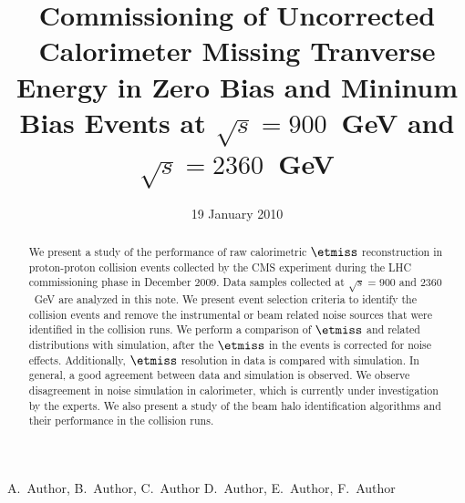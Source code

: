 
\begin{titlepage}


   \date{19 January 2010}

  \title{Commissioning of Uncorrected Calorimeter Missing Tranverse Energy in Zero Bias and Mininum Bias Events at $\sqrt{s}=900$~GeV and $\sqrt{s}=2360$~GeV}

  \begin{Authlist}
    A.~Author, B.~Author, C.~Author
    D.~Author, E.~Author, F.~Author
  \end{Authlist}



  \begin{abstract}
    
    We present a study of the performance of raw calorimetric $\etmiss$ reconstruction in
    proton-proton collision events collected by the CMS experiment during the LHC
    commissioning phase in December 2009. Data samples collected at
    $\sqrt{s}=900$ and $2360$~GeV are analyzed in this note. We present
     event selection criteria to identify the collision events and remove the instrumental or beam
    related noise sources that were identified in the collision
    runs. We perform a comparison of $\etmiss$ and related distributions with
    simulation, after the $\etmiss$ in the events is corrected for noise
    effects. Additionally, $\etmiss$ resolution in data is
    compared with simulation. In general, a good agreement between data and simulation is
    observed. We observe disagreement in noise simulation in
    calorimeter, which is currently under investigation by the
    experts. We also present a study of the beam halo identification
    algorithms and their performance in the collision runs.

  \end{abstract} 

  
\end{titlepage}

